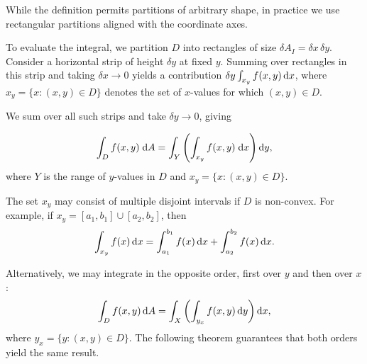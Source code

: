 \documentclass[a4paper]{article}
\begin{document}
While the definition permits partitions of arbitrary shape, in practice we use rectangular partitions aligned with the coordinate axes.

To evaluate the integral, we partition $D$ into rectangles of size $\delta A_I = \delta x \, \delta y$. Consider a horizontal strip of height $\delta y$ at fixed $y$. Summing over rectangles in this strip and taking $\delta x \to 0$ yields a contribution $\delta y \int_{x_y} f(x, y) \, \mathrm{d} x$, where $x_y = \{x : (x, y) \in D\}$ denotes the set of $x$-values for which $(x, y) \in D$.
\begin{center}
\end{center}
We sum over all such strips and take $\delta y\to 0$, giving

\begin{prop}
  \[
    \int_D f(x, y)\;\mathrm{d} A = \int_Y\left(\int_{x_y}f(x, y)\;\mathrm{d} x\right) \mathrm{d} y,
  \]
  where $Y$ is the range of $y$-values in $D$ and $x_y = \{x: (x, y) \in D\}$.
\end{prop}

\begin{rmk}
  The set $x_y$ may consist of multiple disjoint intervals if $D$ is non-convex. For example, if $x_y = [a_1, b_1] \cup [a_2, b_2]$, then
  \[
    \int_{x_y} f(x) \, \mathrm{d} x = \int_{a_1}^{b_1} f(x) \, \mathrm{d} x + \int_{a_2}^{b_2} f(x) \, \mathrm{d} x.
  \]
  \begin{center}
  \end{center}
\end{rmk}
Alternatively, we may integrate in the opposite order, first over $y$ and then over $x$:
\[
  \int_D f(x, y) \, \mathrm{d} A = \int_X \left( \int_{y_x} f(x, y) \, \mathrm{d} y \right) \mathrm{d} x,
\]
where $y_x = \{y : (x, y) \in D\}$. The following theorem guarantees that both orders yield the same result.
\end{document}
